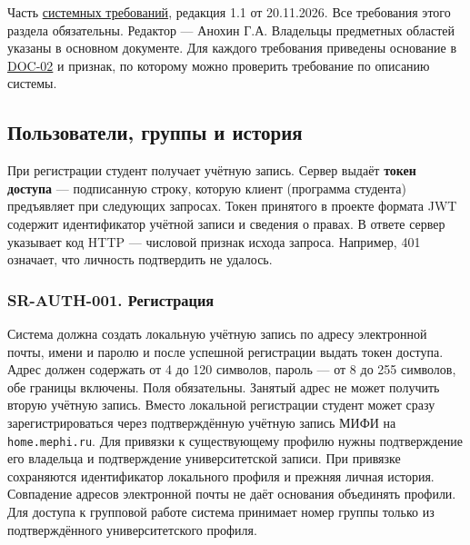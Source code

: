 \documentclass[12pt,a4paper]{article}
\begin{document}
Часть {\hyperlink{doc-05-системные-требования}{системных требований}}, редакция 1.1 от 20.11.2026. Все требования этого раздела обязательны. Редактор --- Анохин Г.А. Владельцы предметных областей указаны в основном документе. Для каждого требования приведены основание в {\href{../02\_Техническое\_задание/Техническое\_задание.pdf\#doc-02-техническое-задание}{DOC-02}} и признак, по которому можно проверить требование по описанию системы.

\subsection{Пользователи, группы и история}\label{ux43fux43eux43bux44cux437ux43eux432ux430ux442ux435ux43bux438-ux433ux440ux443ux43fux43fux44b-ux438-ux438ux441ux442ux43eux440ux438ux44f}

\hypertarget{пользователи-группы-и-история}{}

При регистрации студент получает учётную запись. Сервер выдаёт \textbf{токен доступа} --- подписанную строку, которую клиент (программа студента) предъявляет при следующих запросах. Токен принятого в проекте формата JWT содержит идентификатор учётной записи и сведения о правах. В ответе сервер указывает код HTTP --- числовой признак исхода запроса. Например, 401 означает, что личность подтвердить не удалось.

\subsubsection{SR-AUTH-001. Регистрация}\label{sr-auth-001-ux440ux435ux433ux438ux441ux442ux440ux430ux446ux438ux44f}

\hypertarget{sr-auth-001-регистрация}{}

\hypertarget{sr-auth-001}{}

Система должна создать локальную учётную запись по адресу электронной почты, имени и паролю и после успешной регистрации выдать токен доступа. Адрес должен содержать от 4 до 120 символов, пароль --- от 8 до 255 символов, обе границы включены. Поля обязательны. Занятый адрес не может получить вторую учётную запись. Вместо локальной регистрации студент может сразу зарегистрироваться через подтверждённую учётную запись МИФИ на \texttt{home.\allowbreak{}mephi.\allowbreak{}ru}. Для привязки к существующему профилю нужны подтверждение его владельца и подтверждение университетской записи. При привязке сохраняются идентификатор локального профиля и прежняя личная история. Совпадение адресов электронной почты не даёт основания объединять профили. Для доступа к групповой работе система принимает номер группы только из подтверждённого университетского профиля.
\end{document}

